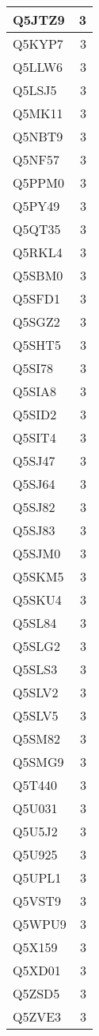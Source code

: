 \documentclass[
]{book}
\theoremstyle{definition}
\theoremstyle{definition}
\theoremstyle{definition}
\theoremstyle{definition}
\theoremstyle{remark}
\begin{document}
\begin{table}
\begin{tabular}{l|r}
\hline
Q5JTZ9 & 3\\
\hline
Q5KYP7 & 3\\
\hline
Q5LLW6 & 3\\
\hline
Q5LSJ5 & 3\\
\hline
Q5MK11 & 3\\
\hline
Q5NBT9 & 3\\
\hline
Q5NF57 & 3\\
\hline
Q5PPM0 & 3\\
\hline
Q5PY49 & 3\\
\hline
Q5QT35 & 3\\
\hline
Q5RKL4 & 3\\
\hline
Q5SBM0 & 3\\
\hline
Q5SFD1 & 3\\
\hline
Q5SGZ2 & 3\\
\hline
Q5SHT5 & 3\\
\hline
Q5SI78 & 3\\
\hline
Q5SIA8 & 3\\
\hline
Q5SID2 & 3\\
\hline
Q5SIT4 & 3\\
\hline
Q5SJ47 & 3\\
\hline
Q5SJ64 & 3\\
\hline
Q5SJ82 & 3\\
\hline
Q5SJ83 & 3\\
\hline
Q5SJM0 & 3\\
\hline
Q5SKM5 & 3\\
\hline
Q5SKU4 & 3\\
\hline
Q5SL84 & 3\\
\hline
Q5SLG2 & 3\\
\hline
Q5SLS3 & 3\\
\hline
Q5SLV2 & 3\\
\hline
Q5SLV5 & 3\\
\hline
Q5SM82 & 3\\
\hline
Q5SMG9 & 3\\
\hline
Q5T440 & 3\\
\hline
Q5U031 & 3\\
\hline
Q5U5J2 & 3\\
\hline
Q5U925 & 3\\
\hline
Q5UPL1 & 3\\
\hline
Q5VST9 & 3\\
\hline
Q5WPU9 & 3\\
\hline
Q5X159 & 3\\
\hline
Q5XD01 & 3\\
\hline
Q5ZSD5 & 3\\
\hline
Q5ZVE3 & 3\\

\end{tabular}
\end{table}
\end{document}
